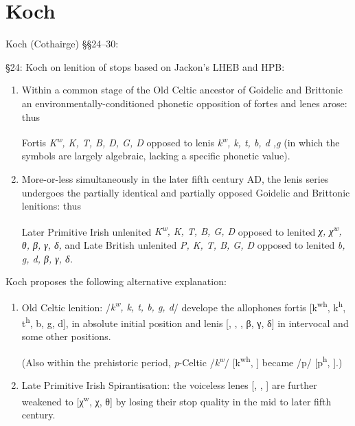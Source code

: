 \section{Koch}
 Koch (Cothairge) \S\S24--30:
 
 \S24: Koch on lenition of stops based on Jackon's LHEB and HPB:
 
 \begin{enumerate}
 \item Within a common stage of the Old Celtic ancestor of Goidelic and Brittonic an environmentally-conditioned phonetic opposition of fortes and lenes arose: thus
 
 Fortis \textit{K\textsuperscript{w}, K, T, B, D, G, D} opposed to lenis \textit{k\textsuperscript{w}, k, t, b, d ,g} (in which the symbols are largely algebraic, lacking a specific phonetic value).
 \item More-or-less simultaneously in the later fifth century AD, the lenis series undergoes the partially identical and partially opposed Goidelic and Brittonic lenitions: thus
 
 Later Primitive Irish unlenited \textit{K\textsuperscript{w}, K, T, B, G, D} opposed to lenited \textit{χ, χ\textsuperscript{w}, θ, β, γ, δ,} and Late British unlenited \textit{P, K, T, B, G, D} opposed to lenited \textit{b, g, d, β, γ, δ.}
 \end{enumerate}
 
 Koch proposes the following alternative explanation:
 
 \begin{enumerate}
 \item Old Celtic lenition: /\textit{k\textsuperscript{w}, k, t, b, g, d}/ develope the allophones fortis [k\textsuperscript{wh}, k\textsuperscript{h}, t\textsuperscript{h}, b, g, d], in absolute initial position and lenis [\gwd, \gd, \dd, β, γ, δ] in intervocal and some other positions.
 
 (Also within the prehistoric period, \textit{p}-Celtic /\textit{k\textsuperscript{w}}/ [k\textsuperscript{wh}, \gwd] became /p/ [p\textsuperscript{h}, \bd].)
 \item Late Primitive Irish Spirantisation: the voiceless lenes [\gwd, \gd, \dd] are further weakened to [χ\textsuperscript{w}, χ, θ] by losing their stop quality in the mid to later fifth century.
 \end{enumerate}
 
